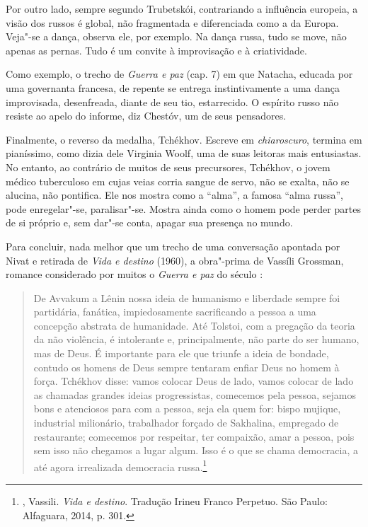 Por outro lado, sempre segundo Trubetskói, contrariando a influência europeia, a visão dos russos é global, não fragmentada e diferenciada como a da Europa. Veja"-se a dança, observa ele, por exemplo. Na dança russa, tudo se move, não apenas as pernas. Tudo é um convite à improvisação e à criatividade.

Como exemplo, o trecho de \emph{Guerra e paz} (cap. 7) em que Natacha, educada por uma governanta francesa, de repente se entrega
instintivamente a uma dança improvisada, desenfreada, diante de seu tio, estarrecido. O espírito russo não resiste ao apelo do informe, diz Chestóv, um de seus pensadores.

Finalmente, o reverso da medalha, Tchékhov. Escreve em \emph{chiaroscuro}, termina em pianíssimo, como dizia dele Virginia
Woolf, uma de suas leitoras mais entusiastas. No entanto, ao contrário de muitos de seus precursores, Tchékhov, o jovem médico tuberculoso em cujas veias corria sangue de servo, não se exalta, não se alucina, não pontifica. Ele nos mostra como a ``alma'', a famosa ``alma russa'', pode enregelar"-se, paralisar"-se. Mostra ainda como o homem pode perder partes de si próprio e, sem dar"-se conta, apagar sua presença no mundo.

Para concluir, nada melhor que um trecho de uma conversação apontada por Nivat e retirada de \emph{Vida e destino} (1960), a obra"-prima de Vassíli Grossman, romance considerado por muitos o \emph{Guerra e paz} do século :

\begin{quotation}
De Avvakum a Lênin nossa ideia de humanismo e liberdade sempre foi partidária, fanática, impiedosamente sacrificando a pessoa a uma concepção abstrata de humanidade. Até Tolstoi, com a pregação da teoria da não violência, é intolerante e, principalmente, não parte do ser humano, mas de Deus. É importante para ele que triunfe a ideia de bondade, contudo os homens de Deus sempre tentaram enfiar Deus no homem à força. Tchékhov disse: vamos colocar Deus de lado, vamos colocar de
lado as chamadas grandes ideias progressistas, comecemos pela pessoa, sejamos bons e atenciosos para com a pessoa, seja ela quem for: bispo mujique, industrial milionário, trabalhador forçado de Sakhalina, empregado de restaurante; comecemos por respeitar, ter compaixão, amar a pessoa, pois sem isso não chegamos a lugar algum. Isso é o que se chama democracia, a até agora irrealizada democracia russa.\footnote{, Vassili. \emph{Vida e destino}. Tradução Irineu Franco Perpetuo. São Paulo: Alfaguara, 2014, p. 301.}
\end{quotation}


